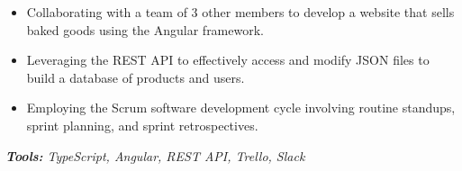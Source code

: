 \documentclass[10pt,letter]{altacv}
\begin{document}

\begin{fullwidth}
\makecvheader
\end{fullwidth}


\medskip


\begin{itemize}
  \item Collaborating with a team of 3 other members to develop a website that sells baked goods using the Angular framework.
  \item Leveraging the REST API to effectively access and modify JSON files to build a database of products and users.
  \item Employing the Scrum software development cycle involving routine standups, sprint planning, and sprint retrospectives.
\end{itemize}
\textit{\textbf{Tools:} TypeScript, Angular, REST API, Trello, Slack}

\end{document}
